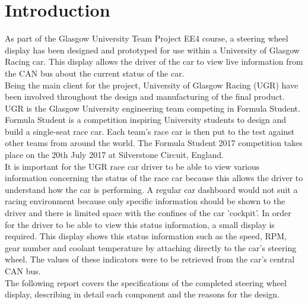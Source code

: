 \documentclass[a4paper,12pt]{article}
\begin{document}
\newpage
\tableofcontents


\newpage
\section{Introduction}
\label{sec:introduction}

As part of the Glasgow University Team Project EE4 course, a steering wheel display has been designed and prototyped for use within a University of Glasgow Racing car. This display allows the driver of the car to view live information from the CAN bus about the current status of the car. \\

Being the main client for the project, University of Glasgow Racing (UGR) have been involved throughout the design and manufacturing of the final product. UGR is the Glasgow University engineering team competing in Formula Student. Formula Student is a competition inspiring University students to design and build a single-seat race car. Each team’s race car is then put to the test against other teams from around the world. The Formula Student 2017 competition takes place on the 20th July 2017 at Silverstone Circuit, England. \\

It is important for the UGR race car driver to be able to view various information concerning the status of the race car because this allows the driver to understand how the car is performing. A regular car dashboard would not suit a racing environment because only specific information should be shown to the driver and there is limited space with the confines of the car 'cockpit'. In order for the driver to be able to view this status information, a small display is required. This display shows this status information such as the speed, RPM, gear number and coolant temperature by attaching directly to the car’s steering wheel. The values of these indicators were to be retrieved from the car's central CAN bus. \\

The following report covers the specifications of the completed steering wheel display, describing in detail each component and the reasons for the design. \\



\end{document}
